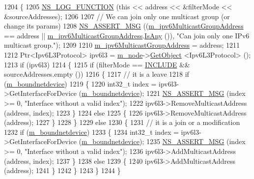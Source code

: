 \begin{DoxyCode}
1204 \{
1205   \hyperlink{log-macros-disabled_8h_a90b90d5bad1f39cb1b64923ea94c0761}{NS\_LOG\_FUNCTION} (\textcolor{keyword}{this} << address << &filterMode << &sourceAddresses);
1206 
1207   \textcolor{comment}{// We can join only one multicast group (or change its params)}
1208   \hyperlink{assert_8h_aff5ece9066c74e681e74999856f08539}{NS\_ASSERT\_MSG} ((\hyperlink{classns3_1_1Socket_a5745d9cdf891f3f0c06b124c4b679ef9}{m\_ipv6MulticastGroupAddress} == address || 
      \hyperlink{classns3_1_1Socket_a5745d9cdf891f3f0c06b124c4b679ef9}{m\_ipv6MulticastGroupAddress}.\hyperlink{classns3_1_1Ipv6Address_a6f15ff7a41a6ae2171cdeda2a53179b8}{IsAny} ()), \textcolor{stringliteral}{"Can join only one IPv6 multicast
       group."});
1209 
1210   \hyperlink{classns3_1_1Socket_a5745d9cdf891f3f0c06b124c4b679ef9}{m\_ipv6MulticastGroupAddress} = address;
1211 
1212   Ptr<Ipv6L3Protocol> ipv6l3 = \hyperlink{classns3_1_1UdpSocketImpl_af6a19247be3d8917b582af77337730c3}{m\_node}->\hyperlink{classns3_1_1Object_a13e18c00017096c8381eb651d5bd0783}{GetObject} <Ipv6L3Protocol> ();
1213   \textcolor{keywordflow}{if} (ipv6l3)
1214     \{
1215       \textcolor{keywordflow}{if} (filterMode == \hyperlink{classns3_1_1Socket_a96f39fe2b73d5691b319093a1e31615da3518a166d4dda6c74bf8aaaade9edf7a}{INCLUDE} && sourceAddresses.empty ())
1216         \{
1217           \textcolor{comment}{// it is a leave}
1218           \textcolor{keywordflow}{if} (\hyperlink{classns3_1_1Socket_a9781d8dfdb5e9364d5dce8f53b768bb5}{m\_boundnetdevice})
1219             \{
1220               int32\_t index = ipv6l3->GetInterfaceForDevice (\hyperlink{classns3_1_1Socket_a9781d8dfdb5e9364d5dce8f53b768bb5}{m\_boundnetdevice});
1221               \hyperlink{assert_8h_aff5ece9066c74e681e74999856f08539}{NS\_ASSERT\_MSG} (index >= 0, \textcolor{stringliteral}{"Interface without a valid index"});
1222               ipv6l3->RemoveMulticastAddress (address, index);
1223             \}
1224           \textcolor{keywordflow}{else}
1225             \{
1226               ipv6l3->RemoveMulticastAddress (address);
1227             \}
1228         \}
1229       \textcolor{keywordflow}{else}
1230         \{
1231           \textcolor{comment}{// it is a join or a modification}
1232           \textcolor{keywordflow}{if} (\hyperlink{classns3_1_1Socket_a9781d8dfdb5e9364d5dce8f53b768bb5}{m\_boundnetdevice})
1233             \{
1234               int32\_t index = ipv6l3->GetInterfaceForDevice (\hyperlink{classns3_1_1Socket_a9781d8dfdb5e9364d5dce8f53b768bb5}{m\_boundnetdevice});
1235               \hyperlink{assert_8h_aff5ece9066c74e681e74999856f08539}{NS\_ASSERT\_MSG} (index >= 0, \textcolor{stringliteral}{"Interface without a valid index"});
1236               ipv6l3->AddMulticastAddress (address, index);
1237             \}
1238           \textcolor{keywordflow}{else}
1239             \{
1240               ipv6l3->AddMulticastAddress (address);
1241             \}
1242         \}
1243     \}
1244 \}
\end{DoxyCode}


